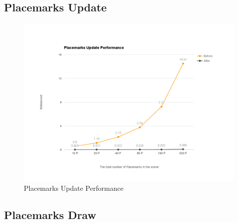 \subsection{Placemarks Update}
\label{section:placemarks-update}




\begin{figure}[H]
	\caption{Placemarks Update Performance}
	\label{fig:placemarks-update-performance}
	\centering
	\includegraphics[width=\textwidth, keepaspectratio]{Figures/placemarks-update-performance.png}
	\decoRule
\end{figure}



\subsection{Placemarks Draw}




